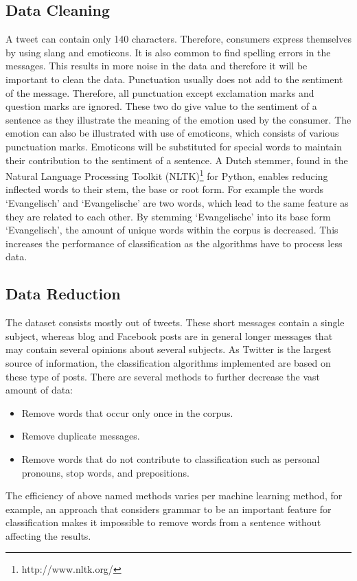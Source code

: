 \documentclass[11pt]{article}
\begin{document}
\subsection{Data Cleaning}
A tweet can contain only 140 characters. Therefore, consumers express themselves by using slang and emoticons. It is also common to find spelling errors in the messages. This results in more noise in the data and therefore it will be important to clean the data. Punctuation usually does not add to the sentiment of the message. Therefore, all punctuation except exclamation marks and question marks are ignored. These two do give value to the sentiment of a sentence as they illustrate the meaning of the emotion used by the consumer. The emotion can also be illustrated with use of emoticons, which consists of various punctuation marks. Emoticons will be substituted for special words to maintain their contribution to the sentiment of a sentence.
A Dutch stemmer, found in the Natural Language Processing Toolkit (NLTK)\footnote{http://www.nltk.org/} for Python, enables reducing inflected words to their stem, the base or root form. For example the words `Evangelisch’ and `Evangelische’ are two words, which lead to the same feature as they are related to each other. By stemming `Evangelische’ into its base form `Evangelisch’, the amount of unique words within the corpus is decreased. This increases the performance of classification as the algorithms have to process less data.
\subsection{Data Reduction}
The dataset consists mostly out of tweets. These short messages contain a single subject, whereas blog and Facebook posts are in general longer messages that may contain several opinions about several subjects. As Twitter is the largest source of information, the classification algorithms implemented are based on these type of posts.
There are several methods to further decrease the vast amount of data:
\begin{itemize}
\item Remove words that occur only once in the corpus.
\item Remove duplicate messages.
\item Remove words that do not contribute to classification such as personal pronouns, stop words, and prepositions.
\end{itemize}
The efficiency of above named methods varies per machine learning method, for example, an approach that considers grammar to be an important feature for classification makes it impossible to remove words from a sentence without affecting the results.
\end{document}

